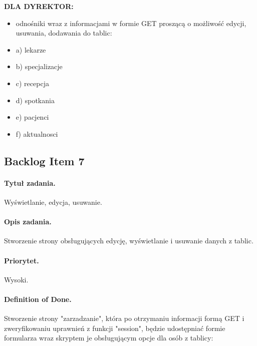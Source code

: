 \documentclass[a4paper]{article} \usepackage{polski} \usepackage[cp1250]{inputenc} \usepackage{url}
\begin{document}
 \textbf{DLA DYREKTOR:}
 \begin {itemize}
\item odnośniki wraz z informacjami w formie GET proszącą o możliwość edycji, usuwania, dodawania do tablic:
\item a) lekarze
\item b) specjalizacje
\item c) recepcja
\item d) spotkania
\item e) pacjenci
\item f) aktualnosci
\end {itemize}


\subsection{Backlog Item 7}\paragraph{Tytuł zadania.} Wyświetlanie, edycja, usuwanie. \paragraph{Opis zadania.} Stworzenie strony obsługujących edycję, wyświetlanie i usuwanie danych z tablic. \paragraph{Priorytet.} Wysoki. \paragraph{Definition of Done.} Stworzenie strony "zarzadzanie", która po otrzymaniu informacji formą GET i zweryfikowaniu uprawnień z funkcji "session", będzie udostępniać formie formularza wraz skryptem je obsługującym opcje dla osób z tablicy:\newline
\end{document}
